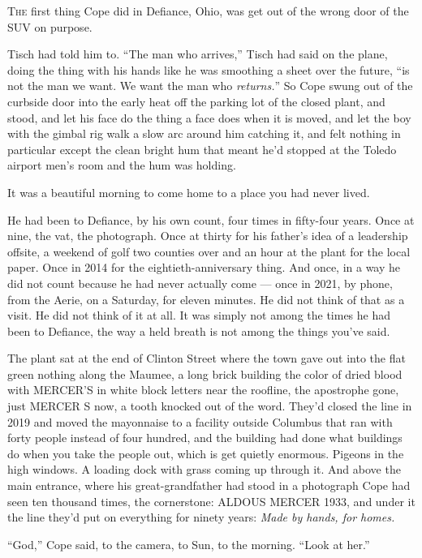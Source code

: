 \documentclass[11pt,openany]{book}
\begin{document}
\lettrine[lines=3, lhang=0.05, nindent=0.25em]{T}{he} first thing Cope did in Defiance, Ohio, was get out of the wrong door of the SUV on purpose.

Tisch had told him to. ``The man who arrives,'' Tisch had said on the plane, doing the thing with his hands like he was smoothing a sheet over the future, ``is not the man we want. We want the man who \textit{returns.}'' So Cope swung out of the curbside door into the early heat off the parking lot of the closed plant, and stood, and let his face do the thing a face does when it is moved, and let the boy with the gimbal rig walk a slow arc around him catching it, and felt nothing in particular except the clean bright hum that meant he'd stopped at the Toledo airport men's room and the hum was holding.

It was a beautiful morning to come home to a place you had never lived.

He had been to Defiance, by his own count, four times in fifty-four years. Once at nine, the vat, the photograph. Once at thirty for his father's idea of a leadership offsite, a weekend of golf two counties over and an hour at the plant for the local paper. Once in 2014 for the eightieth-anniversary thing. And once, in a way he did not count because he had never actually come --- once in 2021, by phone, from the Aerie, on a Saturday, for eleven minutes. He did not think of that as a visit. He did not think of it at all. It was simply not among the times he had been to Defiance, the way a held breath is not among the things you've said.

The plant sat at the end of Clinton Street where the town gave out into the flat green nothing along the Maumee, a long brick building the color of dried blood with MERCER'S in white block letters near the roofline, the apostrophe gone, just MERCER S now, a tooth knocked out of the word. They'd closed the line in 2019 and moved the mayonnaise to a facility outside Columbus that ran with forty people instead of four hundred, and the building had done what buildings do when you take the people out, which is get quietly enormous. Pigeons in the high windows. A loading dock with grass coming up through it. And above the main entrance, where his great-grandfather had stood in a photograph Cope had seen ten thousand times, the cornerstone: ALDOUS MERCER 1933, and under it the line they'd put on everything for ninety years: \textit{Made by hands, for homes.}

``God,'' Cope said, to the camera, to Sun, to the morning. ``Look at her.''
\end{document}
